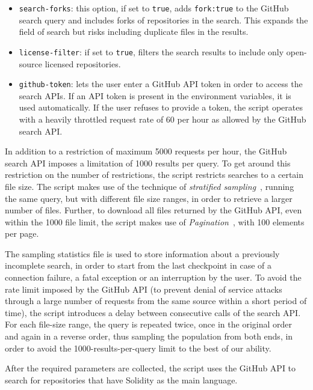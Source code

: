 \documentclass[10pt,conference]{IEEEtran}
\begin{document}
\begin{itemize}
\begin{itemize}
			\item \texttt{search-forks}: this option, if set to \texttt{true}, adds \texttt{fork:true} to the GitHub search query and includes forks of repositories in the search. This expands the field of search but risks including duplicate files in the results.
			\item \texttt{license-filter}: if set to \texttt{true}, filters the search results to include only open-source licensed repositories.
			\item \texttt{github-token}: lets the user enter a GitHub API token in order to access the search APIs. If an API token is present in the environment variables, it is used automatically. If the user refuses to provide a token, the script operates with a heavily throttled request rate of 60 per hour as allowed by the GitHub search API.
		\end{itemize}
		
		In addition to a restriction of maximum 5000 requests per hour, the GitHub search API imposes a limitation of 1000 results per query. To get around this restriction on the number of restrictions, the script restricts searches to a certain file size. The script makes use of the technique of \textit{stratified sampling}~\cite{stratifiedsampling}, running the same query, but with different file size ranges, in order to retrieve a larger number of files. Further, to download all files returned by the GitHub API, even within the 1000 file limit, the script makes use of \textit{Pagination}~\cite{pagination}, with 100 elements per page.
		
		The sampling statistics file is used to store information about a previously incomplete search, in order to start from the last checkpoint in case of a connection failure, a fatal exception or an interruption by the user. To avoid the rate limit imposed by the GitHub API (to prevent denial of service attacks through a large number of requests from the same source within a short period of time), the script introduces a delay between consecutive calls of the search API. For each file-size range, the query is repeated twice, once in the original order and again in a reverse order, thus sampling the population from both ends, in order to avoid the 1000-results-per-query limit to the best of our ability.
		
		After the required parameters are collected, the script uses the GitHub API to search for repositories that have Solidity as the main language. 
		

\end{itemize}
\end{document}
